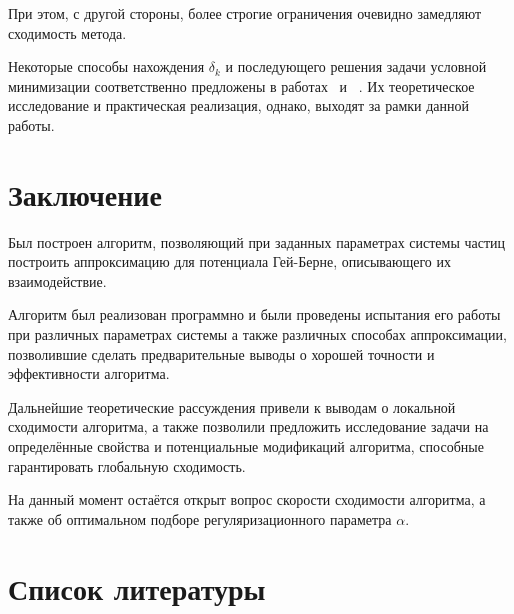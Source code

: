 \documentclass[a4paper,14pt]{extarticle}
\begin{document}
    При этом, с другой стороны, более строгие ограничения очевидно замедляют
    сходимость метода.

    Некоторые способы нахождения $\delta_k$ и последующего решения задачи
    условной минимизации соответственно предложены в
    работах~\cite{bib:Jonca:1988} и
    ~\cite[стр. 134]{bib:Dennis:1983}.
    Их теоретическое исследование и практическая реализация, однако, выходят
    за рамки данной работы.

    \newpage

    \section*{Заключение}

    Был построен алгоритм, позволяющий при заданных
    параметрах системы частиц построить аппроксимацию
    для потенциала Гей-Берне, описывающего их взаимодействие.

    Алгоритм был реализован программно и были проведены
    испытания его работы при различных параметрах системы
    а также различных способах аппроксимации, позволившие
    сделать предварительные выводы о хорошей точности
    и эффективности алгоритма.

    Дальнейшие теоретические рассуждения привели к выводам
    о локальной сходимости алгоритма, а также позволили предложить
    исследование задачи на определённые свойства и
    потенциальные модификаций алгоритма, способные гарантировать
    глобальную сходимость.

    На данный момент остаётся открыт вопрос скорости сходимости алгоритма,
    а также об оптимальном подборе регуляризационного параметра $\alpha$.


    \newpage

    \section*{Список литературы}
\end{document}
